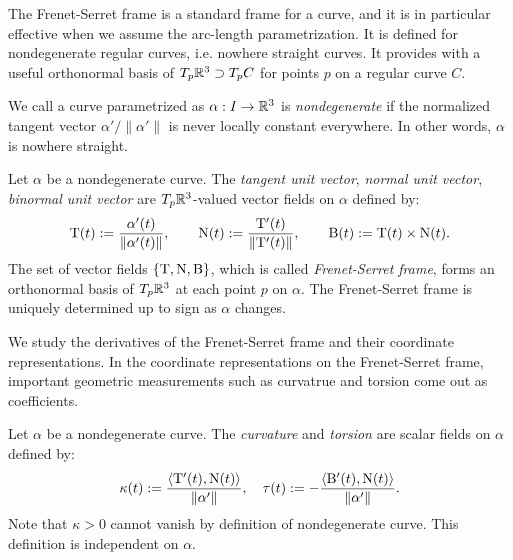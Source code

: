 \documentclass{../../large}
\def\a{\alpha}
\begin{document}
The Frenet-Serret frame is a standard frame for a curve, and it is in particular effective when we assume the arc-length parametrization.
It is defined for nondegenerate regular curves, i.e. nowhere straight curves.
It provides with a useful orthonormal basis of $T_p\mathbb{R}^3\supset T_pC$ for points $p$ on a regular curve $C$.
\begin{defn}
We call a curve parametrized as $\a:I\to\R^3$ is \emph{nondegenerate} if the normalized tangent vector $\a'/\|\a'\|$ is never locally constant everywhere.
In other words, $\a$ is nowhere straight.
\end{defn}

\begin{defn}
Let $\a$ be a nondegenerate curve.
The \emph{tangent unit vector}, \emph{normal unit vector}, \emph{binormal unit vector} are $T_p\mathbb{R}^3$-valued vector fields on $\a$ defined by:
\[\rT(t):=\frac{\a'(t)}{\|\a'(t)\|},\qquad\rN(t):=\frac{\rT'(t)}{\|\rT'(t)\|},\qquad\rB(t):=\rT(t)\times\rN(t).\]
The set of vector fields $\{\mathrm{T},\mathrm{N},\mathrm{B}\}$, which is called \emph{Frenet-Serret frame}, forms an orthonormal basis of $T_p\mathbb{R}^3$ at each point $p$ on $\a$.
The Frenet-Serret frame is uniquely determined up to sign as $\a$ changes.
\end{defn}

We study the derivatives of the Frenet-Serret frame and their coordinate representations.
In the coordinate representations on the Frenet-Serret frame, important geometric measurements such as curvatrue and torsion come out as coefficients.

\begin{defn}
Let $\a$ be a nondegenerate curve.
The \emph{curvature} and \emph{torsion} are scalar fields on $\a$ defined by:
\[\kappa(t):=\frac{\<\rT'(t),\rN(t)\>}{\|\a'\|},\quad\tau(t):=-\frac{\<\rB'(t),\rN(t)\>}{\|\a'\|}.\]
Note that $\kappa>0$ cannot vanish by definition of nondegenerate curve.
This definition is independent on $\a$.
\end{defn}
\end{document}
